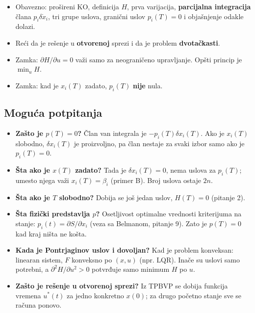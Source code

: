 \documentclass[11pt,a4paper,parskip=half,headsepline,numbers=noenddot]{scrartcl}
\begin{document}
\begin{ispit}[{Pitanje 1}]
\begin{itemize}
\item Obavezno: prošireni KO, definicija \(H\), prva varijacija, \textbf{parcijalna integracija} člana \(p_i\delta\dot x_i\), tri grupe uslova, granični uslov \(p_i(T) = 0\) i objašnjenje odakle dolazi.
\item Reći da je rešenje u \textbf{otvorenoj} sprezi i da je problem \textbf{dvotačkasti}.
\item Zamka: \(\partial H/\partial u = 0\) važi samo za neograničeno upravljanje. Opšti princip je \(\min_u H\).
\item Zamka: kad je \(x_i(T)\) zadato, \(p_i(T)\) \textbf{nije} nula.
\end{itemize}
\end{ispit}

\subsection{Moguća potpitanja}

\begin{itemize}
\item \textbf{Zašto je \(p(T) = 0\)?} Član van integrala je \(-p_i(T)\delta x_i(T)\). Ako je \(x_i(T)\) slobodno, \(\delta x_i(T)\) je proizvoljno, pa član nestaje za svaki izbor samo ako je \(p_i(T) = 0\).
\item \textbf{Šta ako je \(x(T)\) zadato?} Tada je \(\delta x_i(T) = 0\), nema uslova za \(p_i(T)\); umesto njega važi \(x_i(T) = \beta_i\) (primer B). Broj uslova ostaje \(2n\).
\item \textbf{Šta ako je \(T\) slobodno?} Dobija se još jedan uslov, \(H(T) = 0\) (pitanje 2).
\item \textbf{Šta fizički predstavlja \(p\)?} Osetljivost optimalne vrednosti kriterijuma na stanje: \(p_i(t) = \partial S/\partial x_i\) (veza sa Belmanom, pitanje 9). Zato je \(p(T) = 0\) kad kraj ništa ne košta.
\item \textbf{Kada je Pontrjaginov uslov i dovoljan?} Kad je problem konveksan: linearan sistem, \(F\) konveksno po \((x, u)\) (npr. LQR). Inače su uslovi samo potrebni, a \(\partial^2 H/\partial u^2 > 0\) potvrđuje samo minimum \(H\) po \(u\).
\item \textbf{Zašto je rešenje u otvorenoj sprezi?} Iz TPBVP se dobija funkcija vremena \(u^*(t)\) za jedno konkretno \(x(0)\); za drugo početno stanje sve se računa ponovo.
\end{itemize}
\end{document}
